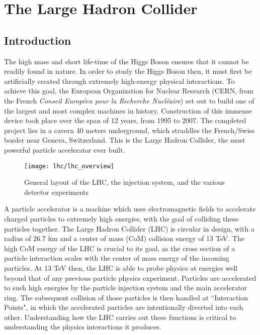 \chapter{The Large Hadron Collider}\label{chapter:lhc}

\section{Introduction}
    The high mass and short life-time of the Higgs Boson ensures that it cannot be readily found in nature.
    In order to study the Higgs Boson then, it must first be artificially created through extremely high-energy physical interactions.
    To achieve this goal, the European Organization for Nuclear Research
        (CERN, from the French \textit{Conseil Européen pour la Recherche Nucléaire})
        set out to build one of the largest and most complex machines in history.
    Construction of this immense device took place over the span of 12 years, from 1995 to 2007.
    The completed project lies in a cavern 40 meters underground, which straddles the French/Swiss border near Geneva, Switzerland.
    This is the Large Hadron Collider, the most powerful particle accelerator ever built.

    \begin{figure}[h]
        \texttt{[image: lhc/lhc\_overview]}
        \caption{General layout of the LHC, the injection system, and the various detector experiments \cite{lhc_run2}}
        \label{fig:lhc_overview}
    \end{figure}

    A particle accelerator is a machine which uses electromagnetic fields to accelerate charged particles to extremely high energies, with the goal of colliding these particles together.
    The Large Hadron Collider (LHC) is circular in design, with a radius of 26.7 km and a center of mass (CoM) collision energy of 13 TeV.
    The high CoM energy of the LHC is crucial to its goal, as the cross section of a particle interaction scales with the center of mass energy of the incoming particles.
    At 13 TeV then, the LHC is able to probe physics at energies well beyond that of any previous particle physics experiment.
    Particles are accelerated to such high energies by the particle injection system and the main accelerator ring.
    The subsequent collision of those particles is then handled at ``Interaction Points", in which the accelerated particles are intentionally diverted into each other.
    Understanding how the LHC carries out these functions is critical to understanding the physics interactions it produces.


